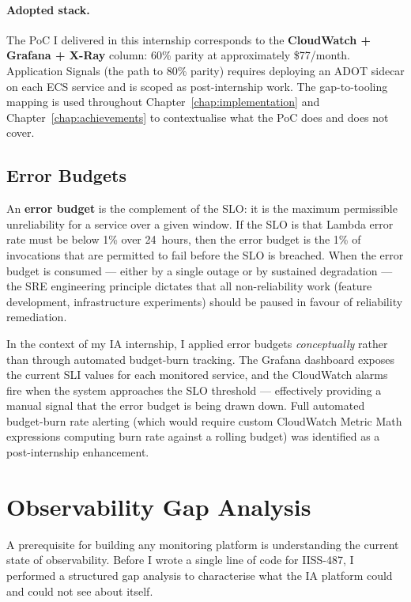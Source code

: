\paragraph{Adopted stack.}
The PoC I delivered in this internship corresponds to the
\textbf{CloudWatch + Grafana + X-Ray} column: 60\% parity at approximately
\$77/month. Application Signals (the path to 80\% parity) requires deploying
an ADOT sidecar on each ECS service and is scoped as post-internship work.
The gap-to-tooling mapping is used throughout Chapter~\ref{chap:implementation}
and Chapter~\ref{chap:achievements} to contextualise what the PoC does and does
not cover.

\subsection{Error Budgets}

An \textbf{error budget} is the complement of the SLO: it is the
maximum permissible unreliability for a service over a given window.
If the SLO is that Lambda error rate must be below 1\% over 24~hours,
then the error budget is the 1\% of invocations that are permitted to
fail before the SLO is breached. When the error budget is consumed ---
either by a single outage or by sustained degradation --- the SRE
engineering principle dictates that all non-reliability work (feature
development, infrastructure experiments) should be paused in favour of
reliability remediation.

In the context of my IA internship, I applied error budgets
\emph{conceptually} rather than through automated budget-burn tracking.
The Grafana dashboard exposes the current SLI values for each monitored
service, and the CloudWatch alarms fire when the system approaches the
SLO threshold --- effectively providing a manual signal that the error
budget is being drawn down. Full automated budget-burn rate alerting
(which would require custom CloudWatch Metric Math expressions computing
burn rate against a rolling budget) was identified as a post-internship
enhancement.

\section{Observability Gap Analysis}
\label{sec:observability_gap}

A prerequisite for building any monitoring platform is understanding the
current state of observability. Before I wrote a single line of code
for IISS-487, I performed a structured gap analysis to characterise
what the IA platform could and could not see about itself.

